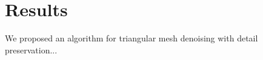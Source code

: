 \chapter{Results}
\label{cha:Results}

We proposed an algorithm for triangular mesh denoising with detail preservation...

